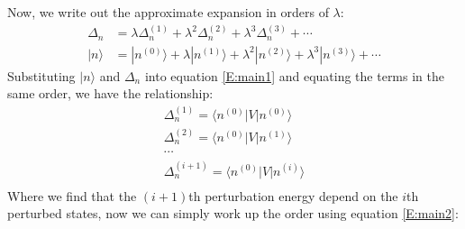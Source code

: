 \documentclass{article}
\newcommand{\order}[2]{#1^{(#2)}}
\newcommand{\statebra}[1]{\langle #1 |}
\newcommand{\stateket}[1]{| #1 \rangle}
\begin{document}
Now, we write out the approximate expansion in orders of $\lambda$:
\begin{align}
    \Delta_n &= \lambda \order{\Delta_n}{1} + \lambda^2 \order{\Delta_n}{2} + \lambda^3 \order{\Delta_n}{3} + \cdots \\
    \stateket{n} &= \stateket{\order{n}{0}} + \lambda \stateket{\order{n}{1}} + 
                    \lambda^2 \stateket{\order{n}{2}} + \lambda^3 \stateket{\order{n}{3}} + \cdots
\end{align}
Substituting $\stateket{n}$ and $\Delta_n$ into equation \eqref{E:main1} and equating the terms in the same order,
we have the relationship:
\begin{gather}
    \order{\Delta_n}{1} = \statebra{\order{n}{0}} V \stateket{\order{n}{0}} \\
    \order{\Delta_n}{2} = \statebra{\order{n}{0}} V \stateket{\order{n}{1}} \\
    \cdots \\
    \order{\Delta_n}{i+1} = \statebra{\order{n}{0}} V \stateket{\order{n}{i}} \\
\end{gather}
Where we find that the $(i+1)$th perturbation energy depend on the $i$th perturbed states, 
now we can simply work up the order using equation \eqref{E:main2}:
\end{document}
